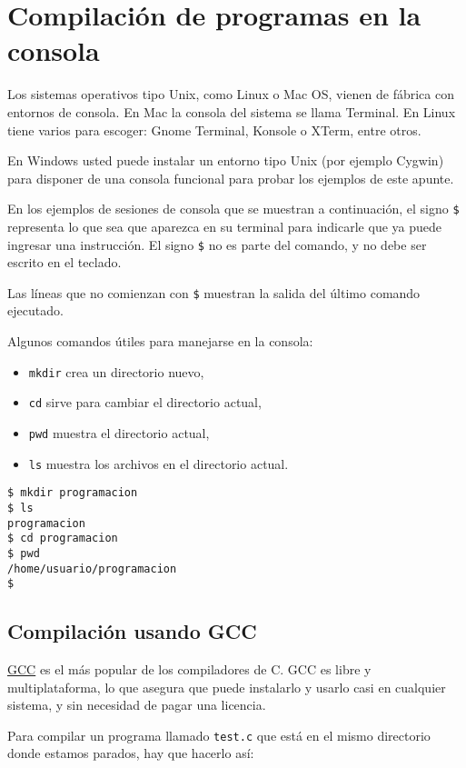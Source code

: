 \chapter{Compilación de programas en la consola}

Los sistemas operativos tipo Unix, como Linux o Mac OS, vienen de
fábrica con entornos de consola. En Mac la consola del sistema se llama
Terminal. En Linux tiene varios para escoger: Gnome Terminal, Konsole o
XTerm, entre otros.

En Windows usted puede instalar un entorno tipo Unix (por ejemplo
Cygwin) para disponer de una consola funcional para probar los ejemplos
de este apunte.

En los ejemplos de sesiones de consola que se muestran a continuación,
el signo \lstinline!$! representa lo que sea que aparezca en su terminal
para indicarle que ya puede ingresar una instrucción. El signo
\lstinline!$! no es parte del comando, y no debe ser escrito en el
teclado.

Las líneas que no comienzan con \lstinline!$! muestran la salida del
último comando ejecutado.

Algunos comandos útiles para manejarse en la consola:

\begin{itemize}
\item
  \lstinline!mkdir! crea un directorio nuevo,
\item
  \lstinline!cd! sirve para cambiar el directorio actual,
\item
  \lstinline!pwd! muestra el directorio actual,
\item
  \lstinline!ls! muestra los archivos en el directorio actual.
\end{itemize}

\begin{lstlisting}
$ mkdir programacion
$ ls
programacion
$ cd programacion
$ pwd
/home/usuario/programacion
$
\end{lstlisting}

\section{Compilación usando GCC}

\href{http://gcc.gnu.org/}{GCC} es el más popular de los compiladores de
C. GCC es libre y multiplataforma, lo que asegura que puede instalarlo y
usarlo casi en cualquier sistema, y sin necesidad de pagar una licencia.

Para compilar un programa llamado \lstinline!test.c! que está en el
mismo directorio donde estamos parados, hay que hacerlo así:

